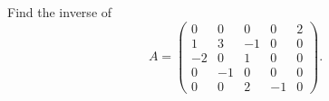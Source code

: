 \documentclass{ximera}
\author{Parisa Fatheddin}
\begin{document}
\begin{exercise}

Find the inverse of 
\[A = \left(\begin{array}{ccccc}
0 & 0& 0& 0& 2\\
1 & 3& -1& 0& 0\\
-2 & 0& 1& 0& 0\\
0 & -1& 0& 0& 0\\
0 & 0& 2& -1& 0
\end{array}\right).
\]
\end{exercise}
\end{document}
